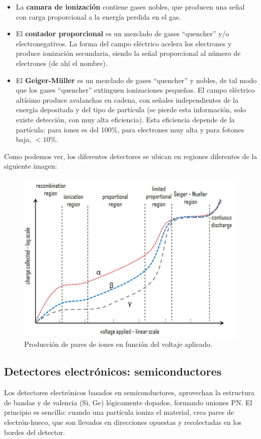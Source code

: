 \begin{itemize}
    \item La \textbf{camara de ionización} contiene gases nobles, que producen una señal con carga proporcional a la energía perdida en el gas. 
    \item El \textbf{contador proporcional} es un mezclado de gases ``quencher'' y/o electronegativos. La forma del campo eléctrico acelera los electrones y produce ionización secundaria, siendo la señal proporcional al número de electrones (de ahí el nombre). 
    \item El \textbf{Geiger-Müller} es un mezclado de gases ``quencher'' y nobles, de tal modo que los gases ``quencher'' extinguen ionizaciones pequeñas. El campo eléctrico altísimo produce avalanchas en cadena, con señales independientes de la energía depositada y del tipo de partícula (se pierde esta información, solo existe detección, con muy alta eficiencia). Esta eficiencia depende de la partícula: para iones es del 100\%, para electrones muy alta y para fotones baja, $<10\%$. 
\end{itemize}
Como podemos ver, los diferentes detectores se ubican en regiones  diferentes de la siguiente imagen: 

\begin{figure}[H] \centering
    \caption{Producción de pares de iones en función del voltaje aplicado.}
    \includegraphics[width=0.7\linewidth]{Cuerpo/Ch_01/Detectores_03.png}
\end{figure}


\subsection{Detectores electrónicos: semiconductores}

Los detectores electrónicos basados en semiconductores, aprovechan la estructura de bandas y de valencia (Si, Ge) lógicamente dopados, formando uniones PN. El principio es sencillo: cuando una partícula ioniza el material, crea pares de electrón-hueco, que son llevados en direcciones opuestas y recolectadas en los bordes del detector. 

